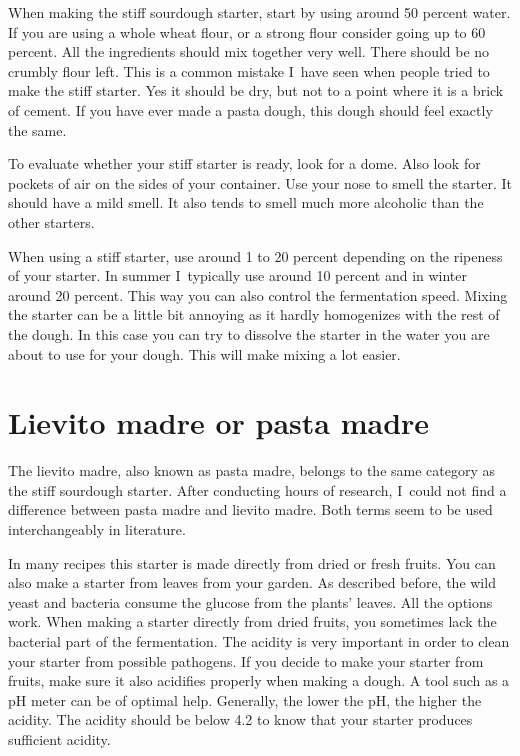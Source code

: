 When making the stiff sourdough starter, start by using around 50 percent
water. If you are using a whole wheat flour, or a strong flour consider going
up to 60 percent. All the ingredients should mix together very well. There
should be no crumbly flour left. This is a common mistake I~have seen when
people tried to make the stiff starter. Yes it should be dry, but not to a
point where it is a brick of cement. If you have ever made a pasta dough, this
dough should feel exactly the same.

To evaluate whether your stiff starter is ready, look for a dome. Also look for
pockets of air on the sides of your container. Use your nose to smell the
starter. It should have a mild smell. It also tends to smell much more
alcoholic than the other starters.

When using a stiff starter, use around 1 to 20 percent depending on the ripeness of
your starter. In summer I~typically use around 10 percent and in winter
around 20 percent. This way you can also control the fermentation speed.
Mixing the starter can be a little bit annoying as it hardly homogenizes with
the rest of the dough. In this case you can try to dissolve the starter in the
water you are about to use for your dough. This will make mixing a lot easier.


\section{Lievito madre or pasta madre}

The lievito madre, also known as pasta madre, belongs to the same category as
the stiff sourdough starter. After conducting hours of research, I~could not
find a difference between pasta madre and lievito madre. Both terms seem to be
used interchangeably in literature.

In many recipes this starter is made directly
from dried or fresh fruits. You can also make a starter from leaves from your
garden. As described before, the wild yeast and bacteria consume the glucose
from the plants' leaves. All the options work. When making a starter directly
from dried fruits, you sometimes lack the bacterial part of the fermentation.
The acidity is very important in order to clean your starter from possible
pathogens. If you decide to make your starter from fruits, make sure it also
acidifies properly when making a dough. A tool such as a pH meter can be of
optimal help. Generally, the lower the pH, the higher the acidity. The acidity
should be below 4.2 to know that your starter produces sufficient acidity.

